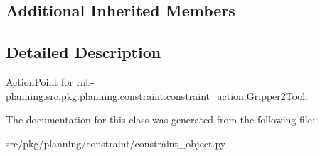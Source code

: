 \subsection*{Additional Inherited Members}


\subsection{Detailed Description}
Action\+Point for \hyperlink{classrnb-planning_1_1src_1_1pkg_1_1planning_1_1constraint_1_1constraint__action_1_1_gripper2_tool}{rnb-\/planning.\+src.\+pkg.\+planning.\+constraint.\+constraint\+\_\+action.\+Gripper2\+Tool}. 

The documentation for this class was generated from the following file\+:\begin{DoxyCompactItemize}
\item 
src/pkg/planning/constraint/constraint\+\_\+object.\+py\end{DoxyCompactItemize}
